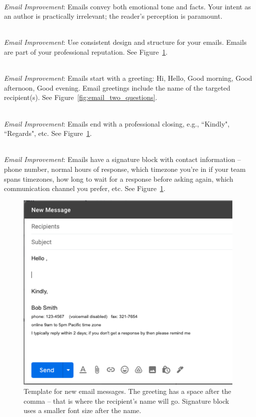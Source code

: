 \ \\
\textit{Email Improvement}: Emails convey both emotional tone and facts. Your intent as an author is practically irrelevant; the reader's perception is paramount. 



\ \\
\textit{Email Improvement}: Use consistent design and structure for your emails. Emails are part of your professional reputation. See Figure~\ref{fig:email_template}.

\ \\
\textit{Email Improvement}: Emails start with a greeting: Hi, Hello, Good morning, Good afternoon, Good evening. 
Email greetings include the name of the targeted recipient(s). See Figure~\ref{fig:email_two_questions}.

\ \\
\textit{Email Improvement}: Emails end with a professional closing, e.g., ``Kindly", ``Regards", etc. See Figure~\ref{fig:email_template}. %

\ \\
\textit{Email Improvement}: Emails have a signature block with contact information -- phone number, normal hours of response, which timezone you're in if your team spans timezones, how long to wait for a response before asking again, which communication channel you prefer, etc. See Figure~\ref{fig:email_template}. %

\begin{figure}%
\includegraphics[width=1\textwidth]{images/email_template.pdf}
\caption{Template for new email messages. The greeting has a space after the comma -- that is where the recipient's name will go. Signature block uses a smaller font size after the name.}
\label{fig:email_template}
\end{figure}


